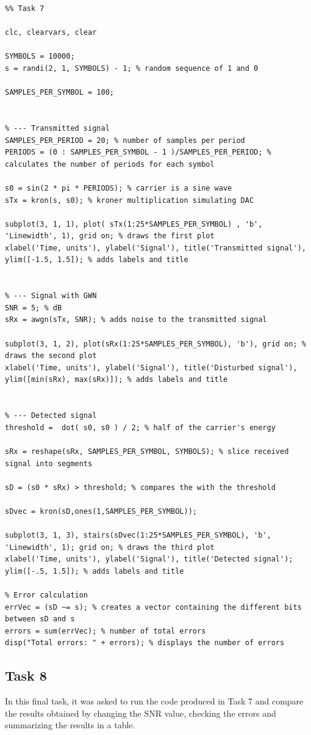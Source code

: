 \begin{lstlisting}
%% Task 7

clc, clearvars, clear

SYMBOLS = 10000;
s = randi(2, 1, SYMBOLS) - 1; % random sequence of 1 and 0

SAMPLES_PER_SYMBOL = 100;


% --- Transmitted signal
SAMPLES_PER_PERIOD = 20; % number of samples per period
PERIODS = (0 : SAMPLES_PER_SYMBOL - 1 )/SAMPLES_PER_PERIOD; % calculates the number of periods for each symbol

s0 = sin(2 * pi * PERIODS); % carrier is a sine wave
sTx = kron(s, s0); % kroner multiplication simulating DAC

subplot(3, 1, 1), plot( sTx(1:25*SAMPLES_PER_SYMBOL) , 'b', 'Linewidth', 1), grid on; % draws the first plot
xlabel('Time, units'), ylabel('Signal'), title('Transmitted signal'), ylim([-1.5, 1.5]); % adds labels and title


% --- Signal with GWN
SNR = 5; % dB
sRx = awgn(sTx, SNR); % adds noise to the transmitted signal

subplot(3, 1, 2), plot(sRx(1:25*SAMPLES_PER_SYMBOL), 'b'), grid on; % draws the second plot
xlabel('Time, units'), ylabel('Signal'), title('Disturbed signal'), ylim([min(sRx), max(sRx)]); % adds labels and title


% --- Detected signal
threshold =  dot( s0, s0 ) / 2; % half of the carrier's energy

sRx = reshape(sRx, SAMPLES_PER_SYMBOL, SYMBOLS); % slice received signal into segments 

sD = (s0 * sRx) > threshold; % compares the with the threshold  

sDvec = kron(sD,ones(1,SAMPLES_PER_SYMBOL));

subplot(3, 1, 3), stairs(sDvec(1:25*SAMPLES_PER_SYMBOL), 'b', 'Linewidth', 1); grid on; % draws the third plot
xlabel('Time, units'), ylabel('Signal'), title('Detected signal'); ylim([-.5, 1.5]); % adds labels and title

% Error calculation
errVec = (sD ~= s); % creates a vector containing the different bits between sD and s
errors = sum(errVec); % number of total errors
disp("Total errors: " + errors); % displays the number of errors
\end{lstlisting}

% 
\subsection*{Task 8}
In this final task, it was asked to run the code produced in Task 7 and compare the results obtained by changing the SNR value, checking the errors and summarizing the results in a table. 

